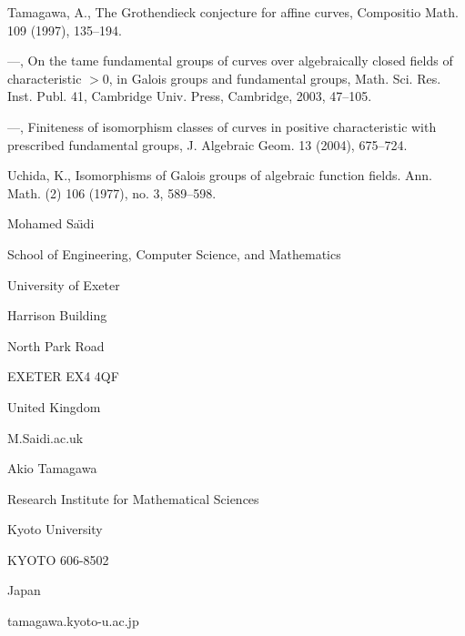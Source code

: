 \noindent
[Tamagawa1] Tamagawa, A., 
The Grothendieck conjecture for affine curves, 
Compositio Math. 109 (1997), %
135--194. 

\noindent
[Tamagawa2] ---, On the tame fundamental groups of curves over algebraically closed 
fields of characteristic $>0$, in Galois groups and fundamental groups, 
Math. Sci. Res. Inst. Publ. 41, Cambridge Univ. Press, Cambridge, 
2003, 47--105. 

\noindent
[Tamagawa3] ---, Finiteness of isomorphism classes of curves in positive 
characteristic 
with prescribed fundamental groups, 
J. Algebraic Geom. 13 (2004), 675--724. 

\noindent
[Uchida] Uchida, K., Isomorphisms of Galois groups of algebraic function fields.  
Ann. Math. (2)  106  (1977), no. 3, 589--598. 

\bigskip
\noindent
Mohamed Sa\"\i di

\noindent
School of Engineering, Computer Science, and Mathematics

\noindent
University of Exeter

\noindent
Harrison Building

\noindent
North Park Road

\noindent
EXETER EX4 4QF 

\noindent
United Kingdom

\noindent
M.Saidi\@exeter.ac.uk

\bigskip
\noindent
Akio Tamagawa

\noindent
Research Institute for Mathematical Sciences

\noindent
Kyoto University

\noindent
KYOTO 606-8502

\noindent
Japan

\noindent
tamagawa\@kurims.kyoto-u.ac.jp
\enddocument


